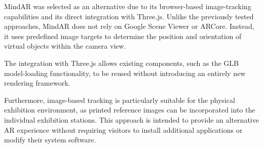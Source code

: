 MindAR was selected as an alternative due to its browser-based image-tracking capabilities and its direct integration with Three.js. Unlike the previously tested approaches, MindAR does not rely on Google Scene Viewer or ARCore. Instead, it uses predefined image targets to determine the position and orientation of virtual objects within the camera view.

The integration with Three.js allows existing components, such as the GLB model-loading functionality, to be reused without introducing an entirely new rendering framework.

Furthermore, image-based tracking is particularly suitable for the physical exhibition environment, as printed reference images can be incorporated into the individual exhibition stations. This approach is intended to provide an alternative AR experience without requiring visitors to install additional applications or modify their system software.

